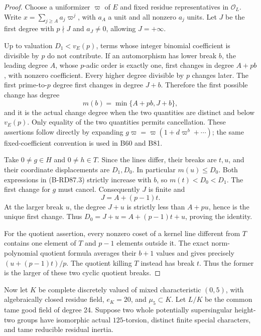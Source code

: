\begin{proof}
Choose a uniformizer \(\varpi\) of \(E\) and fixed
residue representatives in \(\mathcal O_L\). Write
\(x=\sum_{j\ge A}a_j\varpi^j\), with \(a_A\) a unit
and all nonzero \(a_j\) units. Let \(J\) be the first
degree with \(p\nmid J\) and \(a_J\ne0\), allowing
\(J=+\infty\).

Up to valuation \(D_1<v_E(p)\), terms whose integer
binomial coefficient is divisible by \(p\) do not
contribute. If an automorphism has lower break \(b\),
the leading degree \(A\), whose \(p\)-adic order is
exactly one, first changes in degree \(A+pb\), with
nonzero coefficient. Every higher degree divisible
by \(p\) changes later. The first prime-to-\(p\)
degree first changes in degree \(J+b\). Therefore
the first possible change has degree
\[
                 m(b)=\min\{A+pb,J+b\},              \tag{B-RD87.3}
\]
and it is the actual change degree when the two
quantities are distinct and below \(v_E(p)\).
Only equality of the two quantities permits
cancellation. These assertions follow directly
by expanding \(g\varpi=\varpi(1+d\varpi^b+\cdots)\);
the same fixed-coefficient convention is used in B60
and B81.

Take \(0\ne g\in H\) and \(0\ne h\in T\).
Since the lines differ, their breaks are \(t,u\),
and their coordinate displacements are \(D_1,D_0\).
In particular \(m(u)\le D_0\). Both expressions in
(B-RD87.3) strictly increase with \(b\), so
\(m(t)<D_0<D_1\). The first change for \(g\) must
cancel. Consequently \(J\) is finite and
\[
                      J=A+(p-1)t.                    \tag{B-RD87.4}
\]
At the larger break \(u\), the degree \(J+u\) is
strictly less than \(A+pu\), hence is the unique
first change. Thus
\(D_0=J+u=A+(p-1)t+u\), proving the identity.

For the quotient assertion, every nonzero coset of
a kernel line different from \(T\) contains one
element of \(T\) and \(p-1\) elements outside it.
The exact norm-polynomial quotient formula
\cite[Proposition 3.7 and full proof,
pp.~14--15]{ColmezCorpsLocaux} averages their
\(b+1\) values and gives precisely
\((u+(p-1)t)/p\). The quotient killing \(T\) instead
has break \(t\). Thus the former is the larger
of these two cyclic quotient breaks.
\end{proof}

Now let \(K\) be complete discretely valued of mixed
characteristic \((0,5)\), with algebraically closed
residue field, \(e_K=20\), and \(\mu_5\subset K\).
Let \(L/K\) be the common tame good field of degree
24. Suppose two whole potentially supersingular
height-two groups have isomorphic actual
\(125\)-torsion, distinct finite special characters,
and tame reducible residual inertia.

